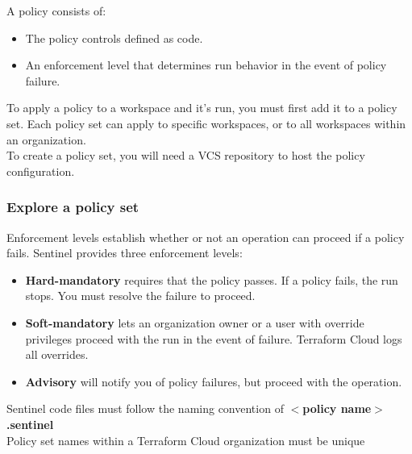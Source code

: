 \documentclass[12pt, letterpaper, twoside]{article}
\begin{document}
A policy consists of:
\begin{itemize}
	\item The policy controls defined as code.
	\item An enforcement level that determines run behavior in the event of policy failure.
\end{itemize}

To apply a policy to a workspace and it's run, you must first add it to a policy set. Each policy set 
can apply to specific workspaces, or to all workspaces within an organization.\\

To create a policy set, you will need a VCS repository to host the policy configuration.

\subsubsection{Explore a policy set}
Enforcement levels establish whether or not an operation can proceed if a policy fails. Sentinel provides three enforcement levels:
\begin{itemize}
	\item \textbf{Hard-mandatory} requires that the policy passes. If a policy fails, the run stops. You must 
		resolve the failure to proceed.
	\item \textbf{Soft-mandatory} lets an organization owner or a user with override privileges proceed with the 
		run in the event of failure. Terraform Cloud logs all overrides.
	\item \textbf{Advisory} will notify you of policy failures, but proceed with the operation.
\end{itemize}

Sentinel code files must follow the naming convention of \textbf{$<$policy name$>$.sentinel}\\

Policy set names within a Terraform Cloud organization must be unique




\printindex
\end{document}

